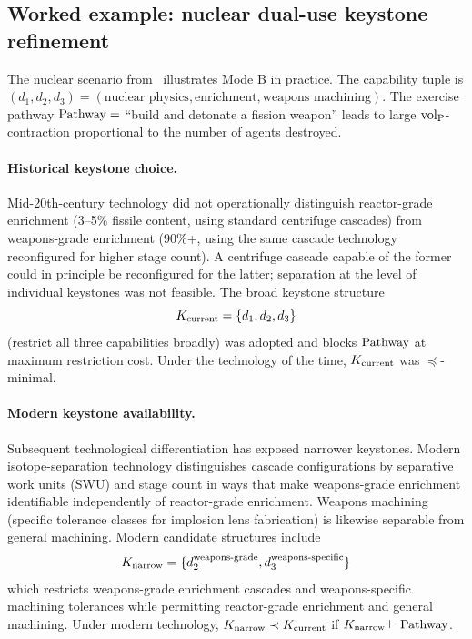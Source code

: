 \subsection{Worked example: nuclear dual-use keystone refinement}
\label{sec:nuclear_example}

The nuclear scenario from~\citep[Definition~2 and
discussion]{lasser2026horizon} illustrates Mode B in practice.  The
capability tuple is $(d_1, d_2, d_3) = (\text{nuclear physics},
\text{enrichment}, \text{weapons machining})$.  The exercise
pathway $\mathrm{Pathway} = $ ``build and detonate a fission weapon''
leads to large ${\operatorname{vol}_{\mathrm{P}}}$-contraction proportional to the number of
agents destroyed.

\paragraph{Historical keystone choice.}
Mid-20th-century technology did not operationally distinguish
reactor-grade enrichment (3--5\% fissile content, using standard
centrifuge cascades) from weapons-grade enrichment (90\%+, using
the same cascade technology reconfigured for higher stage count).
A centrifuge cascade capable of the former could in principle be
reconfigured for the latter; separation at the level of individual
keystones was not feasible.  The broad keystone structure
\[
K_{\mathrm{current}}
   = \{d_1, d_2, d_3\}
\]
(restrict all three capabilities broadly) was adopted and blocks
$\mathrm{Pathway}$ at maximum restriction cost.  Under the technology of
the time, $K_{\mathrm{current}}$ was
$\preceq$-minimal.

\paragraph{Modern keystone availability.}
Subsequent technological differentiation has exposed narrower
keystones.  Modern isotope-separation technology distinguishes
cascade configurations by separative work units (SWU) and stage
count in ways that make weapons-grade enrichment identifiable
independently of reactor-grade enrichment.  Weapons machining
(specific tolerance classes for implosion lens fabrication) is
likewise separable from general machining.  Modern candidate
structures include
\[
K_{\mathrm{narrow}}
   = \{d_2^{\mathrm{weapons\text{-}grade}},
       d_3^{\mathrm{weapons\text{-}specific}}\}
\]
which restricts weapons-grade enrichment cascades and
weapons-specific machining tolerances while permitting
reactor-grade enrichment and general machining.  Under modern
technology, $K_{\mathrm{narrow}} \prec
K_{\mathrm{current}}$ if $K_{\mathrm{narrow}}
\vdash \mathrm{Pathway}$.

